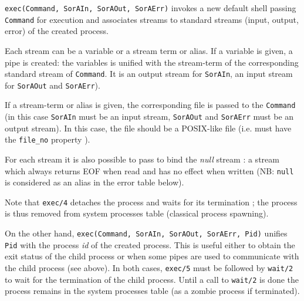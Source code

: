 \Description

\texttt{exec(Command, SorAIn, SorAOut, SorAErr)} invokes a new default
shell passing \texttt{Command} for execution and associates streams to
standard streams (input, output, error) of the created process.

Each stream can be a variable or a stream term or alias. If a variable is
given, a pipe is created: the variables is unified with the stream-term of
the corresponding standard stream of \texttt{Command}. It is an output stream
for \texttt{SorAIn}, an input stream for \texttt{SorAOut} and
\texttt{SorAErr}).

If a stream-term or alias is given, the corresponding file is passed to the
\texttt{Command} (in this case \texttt{SorAIn} must be an input stream,
\texttt{SorAOut} and \texttt{SorAErr} must be an output stream). In this
case, the file should be a POSIX-like file (i.e. must have the
\texttt{file\_no} property ).

For each stream it is also possible to pass  to bind the
\textit{null} stream : a stream which always returns EOF when read and has no
effect when written (NB: \texttt{null} is considered as an alias in the error
table below).

Note that \texttt{exec/4} detaches the process and waits for its
termination ; the process is thus removed from system processes table
(classical process spawning).

On the other hand, \texttt{exec(Command, SorAIn, SorAOut, SorAErr, Pid)}
unifies \texttt{Pid} with the process \textit{id} of the created
process. This is useful either to obtain the exit status of the child process
or when some pipes are used to communicate with the child process (see
above). In both cases, \texttt{exec/5} must be followed by \texttt{wait/2}
 to wait for the termination of the child process.  Until a
call to \texttt{wait/2} is done the process remains in the system processes
table (as a zombie process if terminated).

